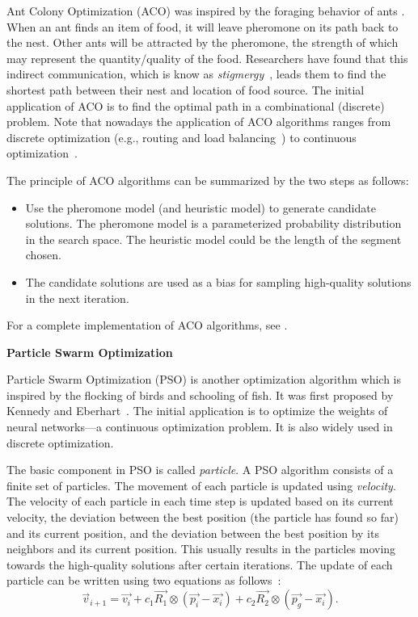 Ant Colony Optimization (ACO) was inspired by the foraging behavior of ants \cite{dorigo2008ant}. When an ant finds an item of food, it will leave pheromone on its path back to the nest. Other ants will be attracted by the pheromone, the strength of which may represent the quantity/quality of the food. Researchers have found that this indirect communication, which is know as \textit{stigmergy}~\cite{Holland:AL:1999}, leads them to find the shortest path between their nest and location of food source. The initial application of ACO is to find the optimal path in a combinational (discrete) problem. Note that nowadays the application of ACO algorithms ranges from discrete optimization (e.g., routing and load balancing~\cite{DiCaro:JAIR:1998}) to continuous optimization~\cite{Dorigo:LNCS:2004}.   

The principle of ACO algorithms can be summarized by the two steps as follows:

\begin{itemize}
\item Use the pheromone model (and heuristic model) to generate candidate solutions. The pheromone model is a parameterized probability distribution in the search space. The heuristic model could be the length of the segment chosen.

\item The candidate solutions are used as a bias for sampling high-quality solutions in the next iteration.
\end{itemize}

For a complete implementation of ACO algorithms, see \cite{dorigo2008ant}. 


\textbf{Particle Swarm Optimization}

Particle Swarm Optimization (PSO) is another optimization algorithm which is inspired by the flocking of birds and schooling of fish. It was first proposed by Kennedy and Eberhart~\cite{Kennedy:ICNN:1995}. The initial application is to optimize the weights of neural networks---a continuous optimization problem. It is also widely used in discrete optimization. 

The basic component in PSO is called \textit{particle}. A PSO algorithm consists of a finite set of particles. The movement of each particle is updated using \textit{velocity}. The velocity of each particle in each time step is updated based on its current velocity, the deviation between the best position (the particle has found so far) and its current position, and the deviation between the best position by its neighbors and its current position. This usually results in the particles moving towards the high-quality solutions after certain iterations. The update of each particle can be written using two equations as follows~\cite{Kennedy:ICNN:1995}:
\begin{equation}\label{eq:particle_velocity_update}
\overrightarrow{v}_{i+1} =  \overrightarrow{v_{i}} + c_1\overrightarrow{R_{1}}\otimes(\overrightarrow{p_{i}} - \overrightarrow{x_{i}}) + c_2\overrightarrow{R_{2}}\otimes(\overrightarrow{p_{g}} - \overrightarrow{x_{i}}). 
\end{equation} 

